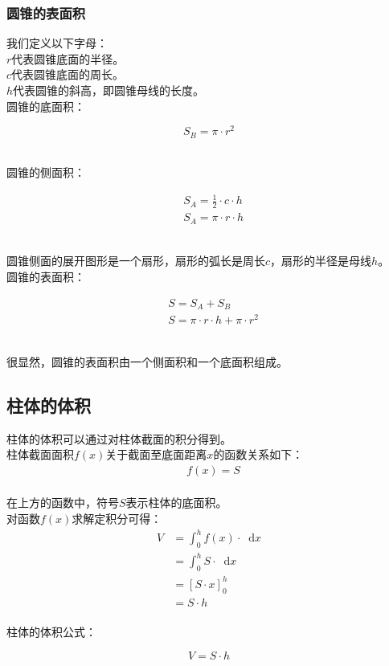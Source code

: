 \documentclass[UTF8]{ctexart}
\newcommand*{\dif}{\mathop{}\!\mathrm{d}}
\begin{document}
\subsubsection{圆锥的表面积}
    我们定义以下字母：\\[3mm]
    $r$代表圆锥底面的半径。\\[3mm]
    $c$代表圆锥底面的周长。\\[3mm]
    $h$代表圆锥的斜高，即圆锥母线的长度。\\[6mm]
    圆锥的底面积：
    \begin{large}
        \begin{equation*}
            S_B=\pi\cdot r^2
        \end{equation*}
    \end{large}\\
    圆锥的侧面积：
    \begin{large}
        \begin{align*}
            &S_A=\frac{1}{2}\cdot c\cdot h\\[3mm]
            &S_A=\pi\cdot r\cdot h
        \end{align*}
    \end{large}\\
    圆锥侧面的展开图形是一个扇形，扇形的弧长是周长$c$，扇形的半径是母线$h$。\\[8mm]
    圆锥的表面积：
    \begin{large}
        \begin{align*}
            &S=S_A+S_B\\[3mm]
            &S=\pi\cdot r\cdot h+\pi\cdot r^2
        \end{align*}
    \end{large}\\
    很显然，圆锥的表面积由一个侧面积和一个底面积组成。    

\newpage

\subsection{柱体的体积}
    柱体的体积可以通过对柱体截面的积分得到。\\[3mm]
    柱体截面面积$f(x)$关于截面至底面距离$x$的函数关系如下：
    \setcounter{equation}{0}
    \begin{align}
        &f(x)=S
    \end{align}\\
    在上方的函数中，符号$S$表示柱体的底面积。\\[8mm]
    对函数$f(x)$求解定积分可得：
    \begin{align}
        V
        &=\int_0^h f(x)\cdot\dif x\\[4mm]
        &=\int_0^h S\cdot\dif x\\[4mm]
        &=[S\cdot x]_0^h\\[4mm]
        &=S\cdot h
    \end{align}\\
    柱体的体积公式：
    \begin{large}
        \begin{equation*}
            V=S\cdot h
        \end{equation*}
    \end{large}
\end{document}
